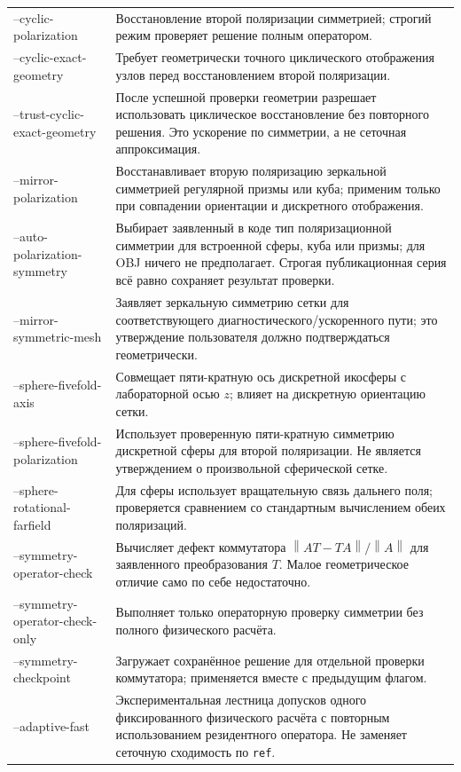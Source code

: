 \documentclass[12pt,a4paper]{article}
\newcommand{\norm}[1]{\left\lVert #1\right\rVert}
\begin{document}
\begin{longtable}{>{\ttfamily\raggedright\arraybackslash}p{}p{}}
--cyclic-polarization & Восстановление второй поляризации симметрией; строгий режим проверяет решение полным оператором.\\
--cyclic-exact-\allowbreak geometry & Требует геометрически точного циклического отображения узлов перед восстановлением второй поляризации.\\
--trust-cyclic-\allowbreak exact-\allowbreak geometry & После успешной проверки геометрии разрешает использовать циклическое восстановление без повторного решения. Это ускорение по симметрии, а не сеточная аппроксимация.\\
--mirror-polarization & Восстанавливает вторую поляризацию зеркальной симметрией регулярной призмы или куба; применим только при совпадении ориентации и дискретного отображения.\\
--auto-polarization-\allowbreak symmetry & Выбирает заявленный в коде тип поляризационной симметрии для встроенной сферы, куба или призмы; для OBJ ничего не предполагает. Строгая публикационная серия всё равно сохраняет результат проверки.\\
--mirror-symmetric-\allowbreak mesh & Заявляет зеркальную симметрию сетки для соответствующего диагностического/ускоренного пути; это утверждение пользователя должно подтверждаться геометрически.\\
--sphere-fivefold-\allowbreak axis & Совмещает пяти-кратную ось дискретной икосферы с лабораторной осью $z$; влияет на дискретную ориентацию сетки.\\
--sphere-fivefold-\allowbreak polarization & Использует проверенную пяти-кратную симметрию дискретной сферы для второй поляризации. Не является утверждением о произвольной сферической сетке.\\
--sphere-rotational-\allowbreak farfield & Для сферы использует вращательную связь дальнего поля; проверяется сравнением со стандартным вычислением обеих поляризаций.\\
--symmetry-operator-\allowbreak check & Вычисляет дефект коммутатора $\norm{AT-TA}/\norm{A}$ для заявленного преобразования $T$. Малое геометрическое отличие само по себе недостаточно.\\
--symmetry-operator-\allowbreak check-only & Выполняет только операторную проверку симметрии без полного физического расчёта.\\
--symmetry-checkpoint & Загружает сохранённое решение для отдельной проверки коммутатора; применяется вместе с предыдущим флагом.\\
--adaptive-fast & Экспериментальная лестница допусков одного фиксированного физического расчёта с повторным использованием резидентного оператора. Не заменяет сеточную сходимость по \texttt{ref}.\\

\end{longtable}
\end{document}
